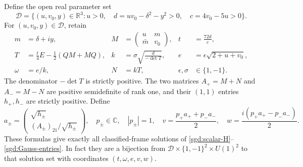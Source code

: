 \begin{theorem}
\label{sgd:parametrization}
Define the open real parameter set
\[
 \mathcal D=\{(u,v_0,y)\in\mathbb R^3:
      u>0,\quad d=uv_0-\delta^2-y^2>0,\quad c=4v_0-5u>0\}.
\]
For $(u,v_0,y)\in\mathcal D$, retain
\begin{align}
 m&=\delta+iy,&
 M&=\begin{pmatrix}u&m\\\bar m&v_0\end{pmatrix},&
 t&=\frac{72d}{c},\label{sgd:parameters1}\\
 T&=\frac t4E-\frac12(QM+MQ),&
 k&=\sigma\sqrt{\frac d{-\det T}},&
 e&=\epsilon\sqrt{2+u+v_0},\label{sgd:parameters2}\\
 \omega&=e/k,&N&=kT,& \epsilon,\sigma&\in\{1,-1\}.
 \label{sgd:parameters3}
\end{align}
The denominator $-\det T$ is strictly positive. The two matrices
$A_+=M+N$ and $A_-=M-N$ are positive semidefinite of rank one,
and their $(1,1)$ entries $h_+,h_-$ are strictly positive. Define
\begin{equation}
 a_\pm=\begin{pmatrix}\sqrt{h_\pm}\\(A_\pm)_{21}/\sqrt{h_\pm}\end{pmatrix},
 \quad p_\pm\in\mathbb C,\quad |p_\pm|=1,\quad
 v=\frac{p_+a_++p_-a_-}{2},\quad
 w=\frac{i(p_+a_+-p_-a_-)}{2}.
 \label{sgd:vectors}
\end{equation}
These formulas give exactly all classified-frame solutions of
\eqref{sgd:scalar-H}--\eqref{sgd:Gauss-entries}. In fact they are a
bijection from $\mathcal D\times\{1,-1\}^2\times U(1)^2$ to
that solution set with coordinates $(t,\omega,e,v,w)$.
\end{theorem}
